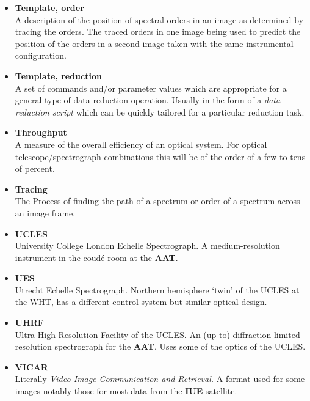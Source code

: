 \documentclass[twoside,11pt]{article}
\newcommand{\htmlref}[2]{#1}
\begin{document}
\begin{itemize}
\item {\bf\label{gl_template_order}Template, order}\\
      A description of the position of spectral orders in an image
      as determined by tracing the orders.  The traced orders in one image
      being used to predict the position of the orders in a second image
      taken with the same instrumental configuration.

\item {\bf\label{gl_template_reduct}Template, reduction}\\
      A set of commands and/or parameter values which are appropriate for a
      general type of data reduction operation.  Usually in the form of a
      {\sl data reduction script} which can be quickly tailored for a
      particular reduction task.

\item {\bf\label{gl_throughput}Throughput}\\
      A measure of the overall efficiency of an optical system.
      For optical telescope/spectrograph combinations this will be of
      the order of a few to tens of percent.

\item {\bf\label{gl_tracing}Tracing}\\
      The Process of finding the path of a spectrum or order of a spectrum
      across an image frame.

\item {\bf\label{gl_ucles}UCLES}\\
      University College London Echelle Spectrograph.
      A medium-resolution instrument in the coud\'{e} room at the
      \htmlref{{\bf AAT}}{gl_aao_aat}.

\item {\bf\label{gl_ues}UES}\\
      Utrecht Echelle Spectrograph.
      Northern hemisphere `twin' of the UCLES at the WHT, has a
      different control system but similar optical design.

\item {\bf\label{gl_uhrf}UHRF}\\
      Ultra-High Resolution Facility of the UCLES.  An (up to)
      diffraction-limited resolution spectrograph for the
      \htmlref{{\bf AAT}}{aao_aat}\@.
      Uses some of the optics of the UCLES.

\item {\bf\label{gl_vicar}VICAR}\\
      Literally {\sl Video Image Communication and Retrieval.}
      A format used for some images notably those for most data
      from the \htmlref{{\bf IUE}}{gl_iue} satellite.


\end{itemize}
\end{document}
